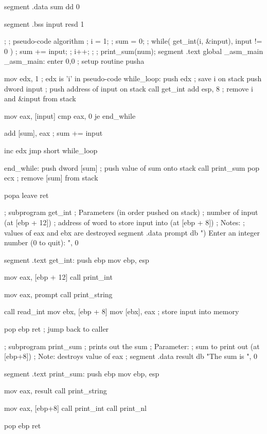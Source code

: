 \begin{AsmCodeListing}[label=sub3.asm]

segment .data
sum     dd   0

segment .bss
input   resd 1

;
; pseudo-code algorithm
; i = 1;
; sum = 0;
; while( get_int(i, &input), input != 0 ) {
;   sum += input;
;   i++;
; }
; print_sum(num);
segment .text
        global  _asm_main
_asm_main:
        enter   0,0               ; setup routine
        pusha

        mov     edx, 1            ; edx is 'i' in pseudo-code
while_loop:
        push    edx               ; save i on stack
        push    dword input       ; push address of input on stack
        call    get_int
        add     esp, 8            ; remove i and &input from stack

        mov     eax, [input]
        cmp     eax, 0
        je      end_while

        add     [sum], eax        ; sum += input

        inc     edx
        jmp     short while_loop

end_while:
        push    dword [sum]       ; push value of sum onto stack
        call    print_sum
        pop     ecx               ; remove [sum] from stack

        popa
        leave                     
        ret

; subprogram get_int
; Parameters (in order pushed on stack)
;   number of input (at [ebp + 12])
;   address of word to store input into (at [ebp + 8])
; Notes:
;   values of eax and ebx are destroyed
segment .data
prompt  db      ") Enter an integer number (0 to quit): ", 0

segment .text
get_int:
        push    ebp
        mov     ebp, esp

        mov     eax, [ebp + 12]
        call    print_int

        mov     eax, prompt
        call    print_string
        
        call    read_int
        mov     ebx, [ebp + 8]
        mov     [ebx], eax         ; store input into memory

        pop     ebp
        ret                        ; jump back to caller

; subprogram print_sum
; prints out the sum
; Parameter:
;   sum to print out (at [ebp+8])
; Note: destroys value of eax
;
segment .data
result  db      "The sum is ", 0

segment .text
print_sum:
        push    ebp
        mov     ebp, esp

        mov     eax, result
        call    print_string

        mov     eax, [ebp+8]
        call    print_int
        call    print_nl

        pop     ebp
        ret
\end{AsmCodeListing}


